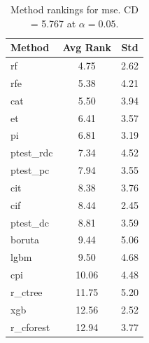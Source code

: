 \begin{table}[h]
\centering
\caption{Method rankings for mse. CD = 5.767 at $\alpha=0.05$.}
\label{tab:ranks_mse}
\begin{tabular}{lcc}
\toprule
Method & Avg Rank & Std \\
\midrule
rf & 4.75 & 2.62 \\
rfe & 5.38 & 4.21 \\
cat & 5.50 & 3.94 \\
et & 6.41 & 3.57 \\
pi & 6.81 & 3.19 \\
ptest_rdc & 7.34 & 4.52 \\
ptest_pc & 7.94 & 3.55 \\
cit & 8.38 & 3.76 \\
cif & 8.44 & 2.45 \\
ptest_dc & 8.81 & 3.59 \\
boruta & 9.44 & 5.06 \\
lgbm & 9.50 & 4.68 \\
cpi & 10.06 & 4.48 \\
r_ctree & 11.75 & 5.20 \\
xgb & 12.56 & 2.52 \\
r_cforest & 12.94 & 3.77 \\
\bottomrule
\end{tabular}
\end{table}